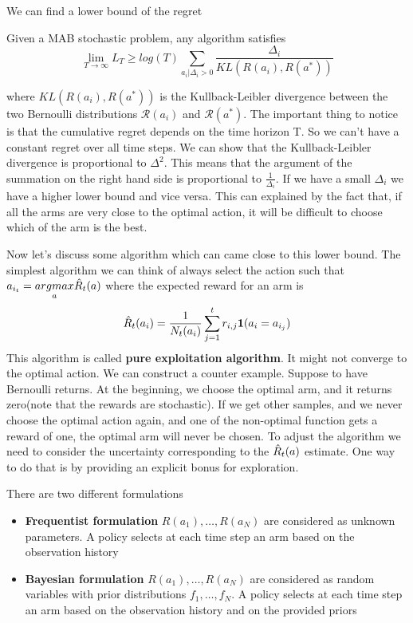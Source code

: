 \documentclass[../main.tex]{subfiles}
\begin{document}
We can find a lower bound of the regret
\begin{theorem}
    Given a MAB stochastic problem, any algorithm satisfies
    \begin{equation}
        \lim_{T \rightarrow \infty} L_T \geq log(T) \sum_{a_i|\Delta_i>0} \frac{\Delta_i}{KL(R(a_i),R(a^*))}
    \end{equation}
\end{theorem}
\par \noindent
where $KL(R(a_i),R(a^*))$ is the Kullback-Leibler divergence between the two Bernoulli distributions $\mathcal{R}(a_i)$ and $\mathcal{R}(a^*)$. The important thing to notice is that the cumulative regret depends on the time horizon T. So we can't have a constant regret over all time steps. We can show that the Kullback-Leibler divergence is proportional to $\Delta^2$. This means that the argument of the summation on the right hand side is proportional to $\frac{1}{\Delta_i}$. If we have a small $\Delta_i$ we have a higher lower bound and vice versa. This can explained by the fact that, if all the arms are very close to the optimal action, it will be difficult to choose which of the arm is the best.

Now let's discuss some algorithm which can came close to this lower bound. The simplest algorithm we can think of always select the action such that $a_{i_t} = \underset{a}{argmax} \Hat{R}_t(a)$ where the expected
reward for an arm is
\begin{equation*}
    \Hat{R}_t(a_i) = \frac{1}{N_t(a_i)} \sum_{j=1}^t r_{i,j} \mathbf{1}(a_i = a_{i_j})
\end{equation*}
This algorithm is called \textbf{pure exploitation algorithm}. It might not converge to the optimal action. We can construct a counter example. Suppose to have Bernoulli returns. At the beginning, we choose the optimal arm, and it returns zero(note that the rewards are stochastic). If we get other samples, and we never choose the optimal action again, and one of the non-optimal function gets a reward of one, the optimal arm will never be chosen.
To adjust the algorithm we need to consider the uncertainty corresponding to the $\Hat{R}_t(a)$ estimate. One way to do that is by providing an explicit bonus for exploration.

There are two different formulations
\begin{itemize}
    \item \textbf{Frequentist formulation} $R(a_1), \dots, R(a_N)$ are considered as unknown parameters. A policy selects at each time step an arm based on the observation history
    \item \textbf{Bayesian formulation} $R(a_1), \dots, R(a_N)$ are considered as random variables with prior distributions $f_1,\dots,f_N$. A policy selects at each time step an arm based on the observation history and on the provided priors
\end{itemize}
\end{document}
